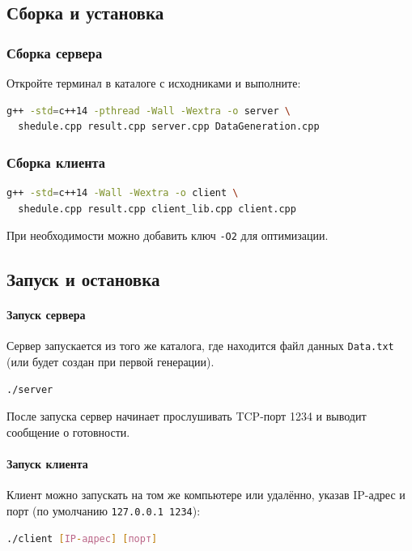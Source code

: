 \documentclass[12pt,a4paper]{article}
\begin{document}
\subsection{Сборка и установка}

\subsubsection{Сборка сервера}
Откройте терминал в каталоге с исходниками и выполните:
\begin{lstlisting}[language=bash]
g++ -std=c++14 -pthread -Wall -Wextra -o server \
  shedule.cpp result.cpp server.cpp DataGeneration.cpp
\end{lstlisting}

\subsubsection{Сборка клиента}
\begin{lstlisting}[language=bash]
g++ -std=c++14 -Wall -Wextra -o client \
  shedule.cpp result.cpp client_lib.cpp client.cpp
\end{lstlisting}

При необходимости можно добавить ключ \texttt{-O2} для оптимизации.

\subsection{Запуск и остановка}

\paragraph{Запуск сервера}
Сервер запускается из того же каталога, где находится файл данных \texttt{Data.txt} (или будет создан при первой генерации).
\begin{lstlisting}[language=bash]
./server
\end{lstlisting}
После запуска сервер начинает прослушивать TCP-порт 1234 и выводит сообщение о готовности.

\paragraph{Запуск клиента}
Клиент можно запускать на том же компьютере или удалённо, указав IP-адрес и порт (по умолчанию \texttt{127.0.0.1 1234}):
\begin{lstlisting}[language=bash]
./client [IP-адрес] [порт]
\end{lstlisting}
\end{document}
